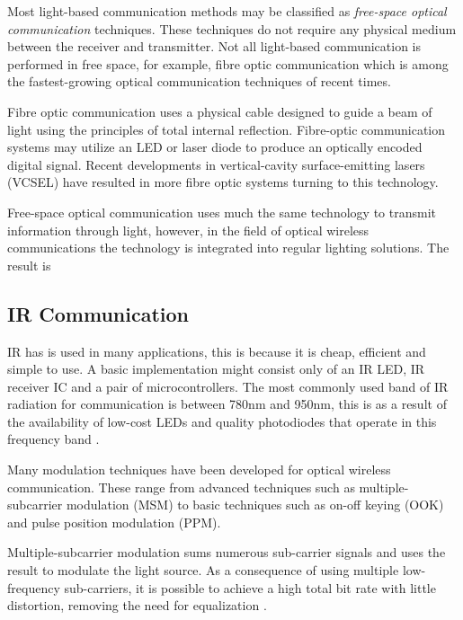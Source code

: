 Most light-based communication methods may be classified as \textit{free-space optical communication} techniques. These techniques do not require any physical medium between the receiver and transmitter. Not all light-based communication is performed in free space, for example, fibre optic communication which is among the fastest-growing optical communication techniques of recent times.

Fibre optic communication uses a physical cable designed to guide a beam of light using the principles of total internal reflection. Fibre-optic communication systems may utilize an LED or laser diode to produce an optically encoded digital signal. Recent developments in vertical-cavity surface-emitting lasers (VCSEL) have resulted in more fibre optic systems turning to this technology.

Free-space optical communication uses much the same technology to transmit information through light, however, in the field of optical wireless communications the technology is integrated into regular lighting solutions. The result is %



\subsection{IR Communication}

IR has is used in many applications, this is because it is cheap, efficient and simple to use. A basic implementation might consist only of an IR LED, IR receiver IC and a pair of microcontrollers. The most commonly used band of IR radiation for communication is between 780nm and 950nm, this is as a result of the availability of low-cost LEDs and quality photodiodes that operate in this frequency band \cite{Elgala2011}.

Many modulation techniques have been developed for optical wireless communication. These range from advanced techniques such as multiple-subcarrier modulation (MSM) to basic techniques such as on-off keying (OOK) and pulse position modulation (PPM).

Multiple-subcarrier modulation sums numerous sub-carrier signals and uses the result to modulate the light source. As a consequence of using multiple low-frequency sub-carriers, it is possible to achieve a high total bit rate with little distortion, removing the need for equalization \cite{Ohtsuki2003}.

